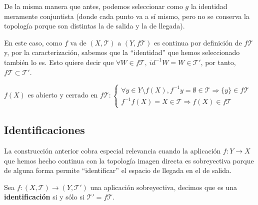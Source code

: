 \begin{demo}
\begin{itemize}
    De la misma manera que antes, podemos seleccionar como $g$ la identidad meramente conjuntista (donde cada punto va a sí mismo, pero no se conserva la topología porque son distintas la de salida y la de llegada). 
    \begin{figure}[H]
        \centering    
    \end{figure}
	En este caso, como $f$ va de $(X,\mathcal{T})$ a $(Y, f\mathcal{T})$ es continua por definición de $f\mathcal{T}$ y, por la caracterización, sabemos que la ``identidad'' que hemos seleccionado también lo es. Esto quiere decir que $\forall W \in f\mathcal{T},\ id^{-1} W = W \in \mathcal{T}'$, por tanto, $f\mathcal{T}\subset \mathcal{T}'$.
\end{itemize}
\end{demo}

\begin{obs}
$f\left( X \right)$ es abierto y cerrado en $f\mathcal{T}: \begin{cases}
    \forall y \in Y \setminus f\left( X \right), f^{-1}y = \emptyset \in \mathcal{T} \Rightarrow \{y\} \in f\mathcal{T}\\
    f^{-1}f\left( X \right) = X \in \mathcal{T} \Rightarrow f\left( X \right) \in f\mathcal{T}
\end{cases}$
\end{obs}

\subsection{Identificaciones}
\label{sub:identificaciones}
La construcción anterior cobra especial relevancia cuando la aplicación $f: Y \rightarrow X$ que hemos hecho continua con la topología imagen directa es sobreyectiva porque de alguna forma permite ``identificar'' el espacio de llegada en el de salida.

\begin{defi}[Identificación]
Sea $f: \left( X, \mathcal{T} \right) \rightarrow \left( Y, \mathcal{T}' \right)$ una aplicación sobreyectiva, decimos que es una \textbf{identificación} si y sólo si $\mathcal{T}' = f\mathcal{T}$.
\end{defi}

